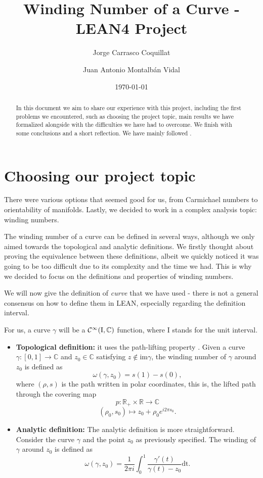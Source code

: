 \documentclass[a4paper,12pt]{article}
\title{Winding Number of a Curve - LEAN4 Project}
\author{Jorge Carrasco Coquillat \and
Juan Antonio Montalbán Vidal}
\date{\today} %
\begin{document}
\maketitle

\begin{abstract}
In this document we aim to share our experience with this project, including the first problems we encountered,
such as choosing the project topic, main results we have formalized alongside with the difficulties we have had to
overcome. We finish with some conclusions and a short reflection. We have mainly followed \cite{COB22}.
\end{abstract}

\section{Choosing our project topic}
There were various options that seemed good for us, from Carmichael numbers
to orientability of manifolds. Lastly, we decided to work in a complex analysis topic:
winding numbers.

The winding number of a curve can be defined in several ways, although we only
aimed towards the topological and analytic definitions. We firstly thought about
proving the equivalence between these definitions, albeit we quickly noticed
it was going to be too difficult due to its complexity and the time we had. 
This is why we decided to focus on the definitions and properties of winding numbers.

We will now give the definition of \textit{curve} that we have used - there is not a general
consensus on how to define them in LEAN, especially regarding the definition interval.

For us, a curve $\gamma$ will be a $\cal{C}^1 (\text{I}, \mathbb{C})$ function, where I stands for the unit interval.

\begin{itemize}
  \item \textbf{Topological definition:} it uses the path-lifting property \cite{sample2}. Given
  a curve $\gamma : [0, 1] \to \mathbb{C}$ and $z_0 \in \mathbb{C}$ satisfying $z \notin \text{im} \gamma$, the winding
  number of $\gamma$ around $z_0$ is defined as
  $$\omega (\gamma, z_0) = s(1) - s(0),$$
  where $(\rho, s)$ is the path written in polar coordinates, this is, the lifted path
  through the covering map
  $$p : \mathbb{R}_+ \times \mathbb{R} \to \mathbb{C}$$
  $$(\rho_0, s_0) \mapsto z_0 + \rho_0 e^{i2\pi s_0}.$$
  \item \textbf{Analytic definition:} The analytic definition is more straightforward. Consider the curve $\gamma$
  and the point $z_0$ as previously specified. The winding of $\gamma$ around $z_0$ is defined as
  $$\omega(\gamma, z_0) = \frac{1}{2\pi i} \int_{0}^{1} {\frac{\gamma'(t)}{\gamma(t)-z_0} \text{dt}}.$$
\end{itemize}
\end{document}
